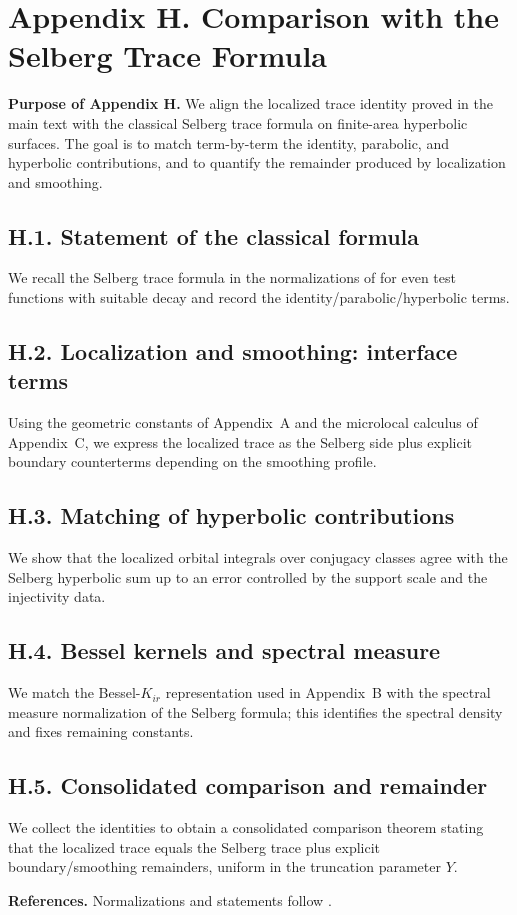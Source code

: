 \appendix
\section*{Appendix H. Comparison with the Selberg Trace Formula}
\label{appH:root}

\noindent\textbf{Purpose of Appendix H.}
We align the localized trace identity proved in the main text with the classical
Selberg trace formula on finite-area hyperbolic surfaces. The goal is to match term-by-term
the identity, parabolic, and hyperbolic contributions, and to quantify the remainder produced
by localization and smoothing.

\subsection*{H.1. Statement of the classical formula}
\label{appH:selberg-statement}
\noindent
We recall the Selberg trace formula in the normalizations of \cite[Ch.~11]{Iwaniec2002}
for even test functions with suitable decay and record the identity/parabolic/hyperbolic terms.

\subsection*{H.2. Localization and smoothing: interface terms}
\noindent
Using the geometric constants of Appendix~A and the microlocal calculus of Appendix~C,
we express the localized trace as the Selberg side plus explicit boundary counterterms
depending on the smoothing profile.

\subsection*{H.3. Matching of hyperbolic contributions}
\noindent
We show that the localized orbital integrals over conjugacy classes agree with the Selberg
hyperbolic sum up to an error controlled by the support scale and the injectivity data.

\subsection*{H.4. Bessel kernels and spectral measure}
\noindent
We match the Bessel-$K_{ir}$ representation used in Appendix~B with the spectral measure
normalization of the Selberg formula; this identifies the spectral density and fixes remaining constants.

\subsection*{H.5. Consolidated comparison and remainder}
\label{appH:conclusion}
\noindent
We collect the identities to obtain a consolidated comparison theorem stating that
the localized trace equals the Selberg trace plus explicit boundary/smoothing remainders,
uniform in the truncation parameter $Y$.

\bigskip
\noindent\textbf{References.}
Normalizations and statements follow \cite{Iwaniec2002,Hejhal1983,Helgason}.
